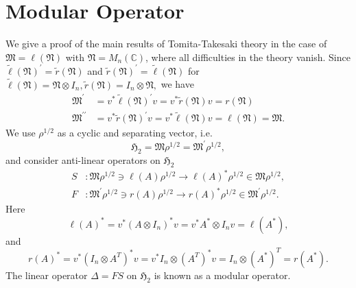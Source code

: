 \documentclass{article}
\begin{document}
\section{Modular Operator}
We give a proof  of the main results of Tomita-Takesaki theory in the case of 
$\mathfrak{M}=\ell(\mathfrak{N})$ with $\mathfrak{N}=M_n(\mathbb{C})$,
where all difficulties in the theory vanish.
Since
$\tilde{\ell}(\mathfrak{N})^\prime=\tilde{r}(\mathfrak{N})$ and $\tilde{r}(\mathfrak{N})^\prime=\tilde{\ell}(\mathfrak{N})$ for 
$
\tilde{\ell}(\mathfrak{N})=\mathfrak{N}\otimes I_n,\tilde{r}(\mathfrak{N})=I_n\otimes \mathfrak{N},
$
we have
\begin{equation}
\begin{split}
\mathfrak{M}^\prime&=v^\ast \tilde{\ell}(\mathfrak{N})^\prime v= v^\ast \tilde{r}(\mathfrak{N})v=r(\mathfrak{N}) \\
\mathfrak{M}^{\prime\prime}&=v^\ast \tilde{r}(\mathfrak{N})^\prime v= v^\ast \tilde{\ell}(\mathfrak{N})v=\ell(\mathfrak{N})=\mathfrak{M}.
\end{split}
\end{equation}
We use $\rho^{1/2}$ as a cyclic and separating vector, i.e. 
$$
\mathfrak{H}_2=\mathfrak{M}\rho^{1/2}=\mathfrak{M}^\prime \rho^{1/2},
$$
and consider  anti-linear operators on $\mathfrak{H}_2$ 
\begin{equation}\label{SF}
	 \begin{split}
		 S&:\mathfrak{M}\rho^{1/2}\ni \ell(A) \rho^{1/2} \to \ell(A)^\ast\rho^{1/2}\in\mathfrak{M}\rho^{1/2},\\
		 F&:\mathfrak{M}^\prime \rho^{1/2}\ni r(A) \rho^{1/2} \to r(A)^\ast\rho^{1/2}\in \mathfrak{M}^\prime \rho^{1/2}.
	 \end{split}
\end{equation}
	Here 
	$$
	\ell(A)^\ast=v^\ast(A\otimes I_n)^\ast v=v^\ast A^\ast \otimes I_n v=\ell(A^\ast),
	$$
	and
	$$
  r(A)^\ast=v^\ast (I_n\otimes A^T)^\ast v=v^\ast I_n\otimes (A^T)^\ast v=I_n\otimes (A^\ast)^T=r(A^\ast).
	$$
	The linear operator $\Delta=FS$ on $\mathfrak{H}_2$ is known as a modular operator.
\end{document}
